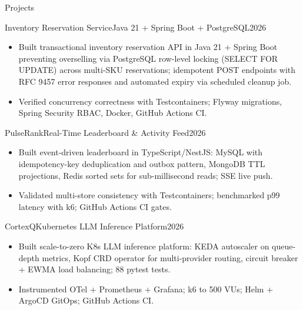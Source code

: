 \documentclass[]{mcdowellcv}
\begin{document}
\begin{cvsection}{Projects}
  \begin{cvsubsection}{Inventory Reservation Service}{Java 21 + Spring Boot + PostgreSQL}{2026}
    \begin{itemize}
      \item Built transactional inventory reservation API in Java 21 + Spring Boot preventing overselling via PostgreSQL row-level locking (SELECT FOR UPDATE) across multi-SKU reservations; idempotent POST endpoints with RFC 9457 error responses and automated expiry via scheduled cleanup job.
      \item Verified concurrency correctness with Testcontainers; Flyway migrations, Spring Security RBAC, Docker, GitHub Actions CI.
    \end{itemize}
    \vspace{-1.5pt}
  \end{cvsubsection}

  \begin{cvsubsection}{PulseRank}{Real-Time Leaderboard \& Activity Feed}{2026}
    \begin{itemize}
      \item Built event-driven leaderboard in TypeScript/NestJS: MySQL with idempotency-key deduplication and outbox pattern, MongoDB TTL projections, Redis sorted sets for sub-millisecond reads; SSE live push.
      \item Validated multi-store consistency with Testcontainers; benchmarked p99 latency with k6; GitHub Actions CI gates.
    \end{itemize}
    \vspace{-1.5pt}
  \end{cvsubsection}

  \begin{cvsubsection}{CortexQ}{Kubernetes LLM Inference Platform}{2026}
    \begin{itemize}
      \item Built scale-to-zero K8s LLM inference platform: KEDA autoscaler on queue-depth metrics, Kopf CRD operator for multi-provider routing, circuit breaker + EWMA load balancing; 88 pytest tests.
      \item Instrumented OTel + Prometheus + Grafana; k6 to 500 VUs; Helm + ArgoCD GitOps; GitHub Actions CI.
    \end{itemize}
  \end{cvsubsection}
\end{cvsection}
\end{document}

